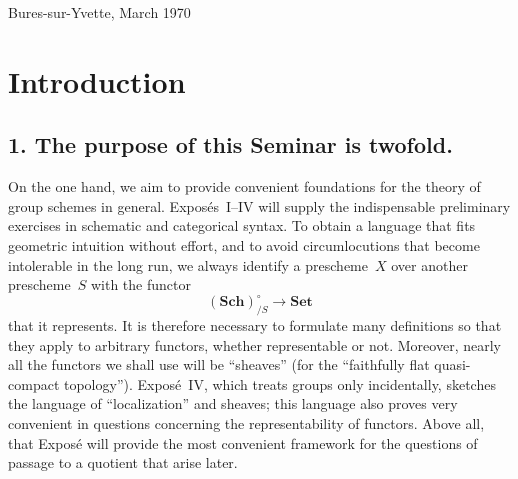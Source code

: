 \begin{flushright}
Bures-sur-Yvette, March 1970
\end{flushright}

\clearpage
\thispagestyle{empty}
\mbox{}
\clearpage

\chapter*{Introduction}

\section*{1. The purpose of this Seminar is twofold.}

On the one hand, we aim to provide convenient foundations for the theory of group
schemes in general.  Expos\'es~I--IV will supply the indispensable preliminary
exercises in schematic and categorical syntax.  To obtain a language that fits
geometric intuition without effort, and to avoid circumlocutions that become
intolerable in the long run, we always identify a prescheme~$X$ over another
prescheme~$S$ with the functor
\[
  (\mathbf{Sch})_{/S}^{\circ}\longrightarrow \mathbf{Set}
\]
that it represents.  It is therefore
necessary to formulate many definitions so that they apply to arbitrary functors,
whether representable or not.  Moreover, nearly all the functors we shall use will
be ``sheaves'' (for the ``faithfully flat quasi-compact topology'').  Expos\'e~IV,
which treats groups only incidentally, sketches the language of ``localization'' and
sheaves; this language also proves very convenient in questions concerning the
representability of functors.  Above all, that Expos\'e will provide the most
convenient framework for the questions of passage to a quotient that arise later.

